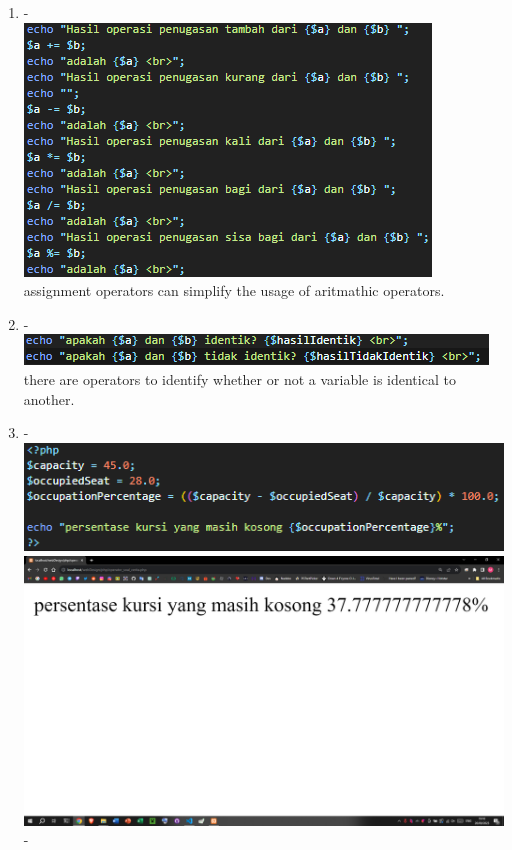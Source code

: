 \documentclass[12pt,titlepage]{article}
\begin{document}
\begin{enumerate}[label*=\arabic*.]
\begin{enumerate}[label*=\arabic*.]
        \item - \\ \includegraphics[width=.8\textwidth]{images/figures/fig4.png} \\ assignment operators can simplify the usage of aritmathic operators. 
        \item - \\ \includegraphics[width=.8\textwidth]{images/figures/fig5.png} \\ there are operators to identify whether or not a variable is identical to another. 
        \item - \\ \includegraphics[width=.8\textwidth]{images/figures/fig6.png} \\ \includegraphics[width=.8\textwidth]{images/figures/fig7.png} \\ -
    \end{enumerate}

\end{enumerate}
\end{document}
